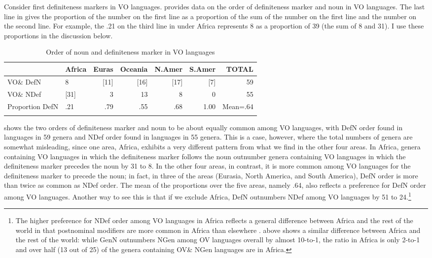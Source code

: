 \documentclass[output=paper]{langsci/langscibook}
\begin{document}
Consider first definiteness markers in VO languages.  provides data on the order of definiteness marker and noun in VO languages. The last line in  gives the proportion of the number on the first line as a proportion of the sum of the number on the first line and the number on the second line. For example, the .21 on the third line in  under Africa represents 8 as a proportion of 39 (the sum of 8 and 31). I use these proportions in the discussion below.

\begin{table}
\begin{tabularx}{\textwidth}{Xlrrrrr} 
\lsptoprule
& \bfseries Africa & \bfseries Euras & \bfseries Oceania & \bfseries N.Amer & \bfseries S.Amer & \bfseries TOTAL\\
\midrule
VO\& DefN & 8 & [11] & [16] & [17] & [7] & 59\\
VO\& NDef & [31] & 3 & 13 & 8 & 0 & 55\\
Proportion DefN & .21 & .79 & .55 & .68 & 1.00 & Mean=.64\\
\lspbottomrule
\end{tabularx}
\caption{\label{tab:dryer:8}Order of noun and definiteness marker in VO languages}
\end{table}

 shows the two orders of definiteness marker and noun to be about equally common among VO languages, with DefN order found in languages in 59 genera and NDef order found in languages in 55 genera. This is a case, however, where the total numbers of genera are somewhat misleading, since one area, Africa, exhibits a very different pattern from what we find in the other four areas. In Africa, genera containing VO languages in which the definiteness marker follows the noun outnumber genera containing VO languages in which the definiteness marker precedes the noun by 31 to 8. In the other four areas, in contrast, it is more common among VO languages for the definiteness marker to precede the noun; in fact, in three of the areas (Eurasia, North America, and South America), DefN order is more than twice as common as NDef order. The mean of the proportions over the five areas, namely .64, also reflects a preference for DefN order among VO languages. Another way to see this is that if we exclude Africa, DefN outnumbers NDef among VO languages by 51 to 24.\footnote{The higher preference for NDef order among VO languages in Africa reflects a general difference between Africa and the rest of the world in that postnominal modifiers are more common in Africa than elsewhere \citep{Dryer2010}.  above shows a similar difference between Africa and the rest of the world: while GenN outnumbers NGen among OV languages overall by almost 10-to-1, the ratio in Africa is only 2-to-1 and over half (13 out of 25) of the genera containing OV\& NGen languages are in Africa.}
\end{document}
